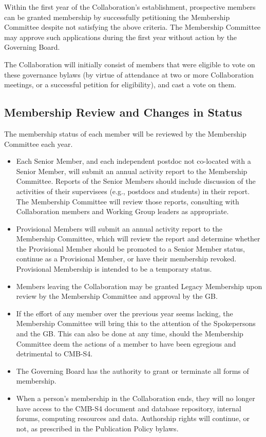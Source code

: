 \documentclass[12pt]{article}
\begin{document}
Within the first year of the Collaboration's establishment, prospective members can be granted membership by successfully petitioning the Membership Committee despite not satisfying the above criteria.  The Membership Committee may approve such applications during the first year without action by the Governing Board.  

The Collaboration will initially consist of members that were eligible to vote on these governance bylaws (by virtue of attendance at two or more Collaboration meetings, or a successful petition for eligibility), and cast a vote on them. 

\subsection{Membership Review and Changes in Status}
The membership status of each member will be reviewed by the Membership Committee each year. 

\begin{itemize} 

\item Each Senior Member, and each independent postdoc not co-located with a Senior Member, will submit an annual activity report to the Membership Committee.  Reports of the Senior Members should include discussion of the activities of their supervisees (e.g., postdocs and students) in their report. The Membership Committee will review those reports, consulting with Collaboration members and Working Group leaders as appropriate.

\item Provisional Members will submit an annual activity report to the Membership Committee, which will review the report and determine whether the Provisional Member should be promoted to a Senior Member status, continue as a Provisional Member, or have their membership revoked.  Provisional Membership is intended to be a temporary status.

\item Members leaving the Collaboration may be granted Legacy Membership upon review by the Membership Committee and approval by the GB.

\item If the effort of any member over the previous year seems lacking, the Membership Committee will bring this to the attention of the Spokepersons and the GB.  This can also be done at any time, should the Membership Committee deem the actions of a member to have been egregious and detrimental to CMB-S4.

\item The Governing Board has the authority to grant or terminate all forms of membership.

\item When a person's membership in the Collaboration ends, they will no longer have access to the CMB-S4 document and database repository, internal forums, computing resources and data.  Authorship rights will continue, or not, as prescribed in the Publication Policy bylaws.


\end{itemize}
\end{document}
